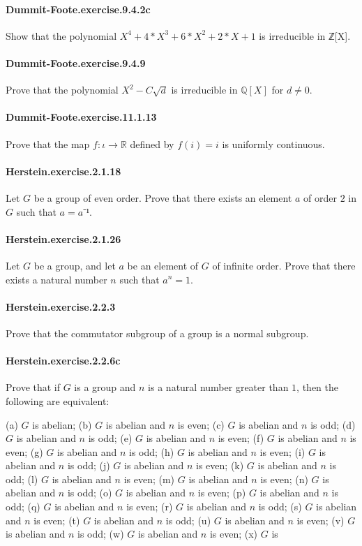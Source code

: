 \documentclass{article}
\begin{document}
\paragraph{Dummit-Foote.exercise.9.4.2c} Show that the polynomial $X^4 + 4*X^3 + 6*X^2 + 2*X + 1$ is irreducible in ℤ[X].

\paragraph{Dummit-Foote.exercise.9.4.9} Prove that the polynomial $X^2 - C \sqrt{d}$ is irreducible in $\mathbb{Q}[X]$ for $d \neq 0$.

\paragraph{Dummit-Foote.exercise.11.1.13} Prove that the map $f : ι → ℝ$ defined by $f(i) = i$ is uniformly continuous.

\paragraph{Herstein.exercise.2.1.18} Let $G$ be a group of even order. Prove that there exists an element $a$ of order $2$ in $G$ such that $a = a⁻¹$.

\paragraph{Herstein.exercise.2.1.26} Let $G$ be a group, and let $a$ be an element of $G$ of infinite order. Prove that there exists a natural number $n$ such that $a^n = 1$.

\paragraph{Herstein.exercise.2.2.3} Prove that the commutator subgroup of a group is a normal subgroup.

\paragraph{Herstein.exercise.2.2.6c} Prove that if $G$ is a group and $n$ is a natural number greater than $1$, then the following are equivalent:

(a) $G$ is abelian;
(b) $G$ is abelian and $n$ is even;
(c) $G$ is abelian and $n$ is odd;
(d) $G$ is abelian and $n$ is odd;
(e) $G$ is abelian and $n$ is even;
(f) $G$ is abelian and $n$ is even;
(g) $G$ is abelian and $n$ is odd;
(h) $G$ is abelian and $n$ is even;
(i) $G$ is abelian and $n$ is odd;
(j) $G$ is abelian and $n$ is even;
(k) $G$ is abelian and $n$ is odd;
(l) $G$ is abelian and $n$ is even;
(m) $G$ is abelian and $n$ is even;
(n) $G$ is abelian and $n$ is odd;
(o) $G$ is abelian and $n$ is even;
(p) $G$ is abelian and $n$ is odd;
(q) $G$ is abelian and $n$ is even;
(r) $G$ is abelian and $n$ is odd;
(s) $G$ is abelian and $n$ is even;
(t) $G$ is abelian and $n$ is odd;
(u) $G$ is abelian and $n$ is even;
(v) $G$ is abelian and $n$ is odd;
(w) $G$ is abelian and $n$ is even;
(x) $G$ is
\end{document}
